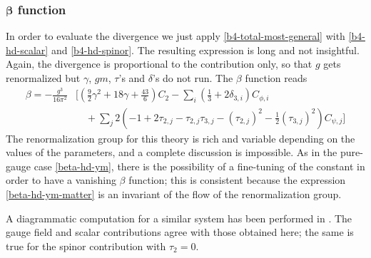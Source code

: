\subsubsection{$\boldsymbol \beta$ function}

In order to evaluate the divergence we just apply \eqref{b4-total-most-general} with  \eqref{b4-hd-scalar} and \eqref{b4-hd-spinor}. %
The resulting expression is long and not insightful.
Again, the divergence is proportional to the \ym{} contribution only, so that $g$ gets renormalized but $\gamma$, $gm$, $\tau$'s and $\delta$'s do not run. The $\beta$ function reads 
\begin{equation}\label{beta-hd-ym-matter}
\begin{split}
\beta  = 
 - \frac{g^3}{16 \pi^2}
& \bigg[
\left( \frac{9}{2} \gamma^2 
+ 18 \gamma + \frac{43}{6}\right) C_2
- \sum_i	 \left( \frac{1}{3} + 2 \delta_{3,i} \right) C_{\phi,i}
\\
& \quad
+ \sum_j 2 \left(
- 1	
+ 2 \tau_{2,j}
-  \tau_{2,j} \tau_{3,j}
-  (\tau_{2,j})^2
- \frac{1}{2} (\tau_{3,j})^2
\right) C_{\psi,j}
\bigg]
\end{split}
\end{equation}
The renormalization group for this theory is rich and variable depending on the values of the parameters, and a complete discussion is impossible. As in the pure-gauge case \eqref{beta-hd-ym}, there is the possibility of a fine-tuning of the constant in order to have a vanishing $\beta$ function; this is consistent because the expression \eqref{beta-hd-ym-matter} is an invariant of the flow of the renormalization group.

A diagrammatic computation for a similar system has been performed in \cite{Grinstein:2008qq}.
The gauge field and scalar contributions agree with those obtained here; the same is true for the spinor contribution with $\tau_2=0$.












